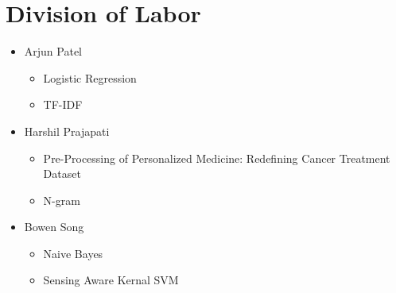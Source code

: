 \documentclass[a4paper, 11pt]{article}
\begin{document}
\newpage
\section*{Division of Labor}
\begin{itemize}
	\item  Arjun Patel
	\begin{itemize}
		\item Logistic Regression
		\item TF-IDF
		\end{itemize}
	\item  Harshil Prajapati
	\begin{itemize}
		\item Pre-Processing of Personalized Medicine: Redefining Cancer Treatment Dataset
		\item N-gram
	\end{itemize}
	\item Bowen Song
	\begin{itemize}
		\item Naive Bayes 
		\item Sensing Aware Kernal SVM
	\end{itemize}
\end{itemize}


\nocite{*}
{\small


}
\end{document}
